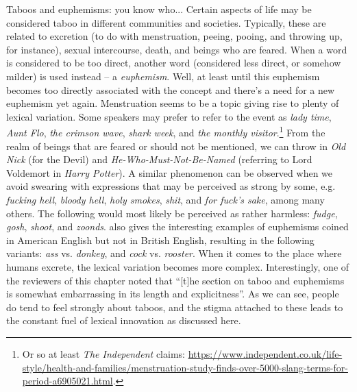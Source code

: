 \begin{miscbox}{Taboos and euphemisms: you know who...}
Certain aspects of life may be considered taboo in different communities and societies. Typically, these are related to excretion (to do with menstruation, peeing, pooing, and throwing up, for instance), sexual intercourse, death, and beings who are feared. When a word is considered to be too direct, another word (considered less direct, or somehow milder) is used instead -- a \textit{euphemism}. Well, at least until this euphemism becomes too directly associated with the concept and there's a need for a new euphemism yet again. Menstruation seems to be a topic giving rise to plenty of lexical variation. Some speakers may prefer to refer to the event as \textit{lady time}, \textit{Aunt Flo}, \textit{the crimson wave}, \textit{shark week}, and \textit{the monthly visitor}.\footnote{Or so at least \textit{The Independent} claims: \url{https://www.independent.co.uk/life-style/health-and-families/menstruation-study-finds-over-5000-slang-terms-for-period-a6905021.html}.} From the realm of beings that are feared or should not be mentioned, we can throw in \textit{Old Nick} (for the Devil) and \textit{He-Who-Must-Not-Be-Named} (referring to Lord Voldemort in \textit{Harry Potter}). A similar phenomenon can be observed when we avoid swearing with expressions that may be perceived as strong by some, e.g. \textit{fucking hell}, \textit{bloody hell}, \textit{holy smokes}, \textit{shit}, and \textit{for fuck's sake}, among many others. The following would most likely be perceived as rather harmless: \textit{fudge}, \textit{gosh}, \textit{shoot}, and \textit{zoonds}. \citet{Campbell2013} also gives the interesting examples of euphemisms coined in American English but not in British English, resulting in the following variants: \textit{ass} vs. \textit{donkey}, and \textit{cock} vs. \textit{rooster}. When it comes to the place where humans excrete, the lexical variation becomes more complex. Interestingly, one of the reviewers of this chapter noted that ``[t]he section on taboo and euphemisms is somewhat embarrassing in its length and explicitness''. As we can see, people do tend to feel strongly about taboos, and the stigma attached to these leads to the constant fuel of lexical innovation as discussed here.
\end{miscbox}



